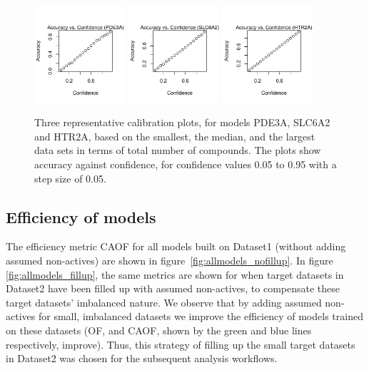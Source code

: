 \documentclass[utf8]{frontiersSCNS} %
\newcommand{\inlinetodo}[1]{{\color{magenta}\oldtodo[inline]{\color{white}\textsf{#1}}}}
\begin{document}
\begin{figure}[h!]
\includegraphics[width=0.3\textwidth]{figures/calibration_plots/pde3a_calib.pdf}
\includegraphics[width=0.3\textwidth]{figures/calibration_plots/slc6a2_calib.pdf}
\includegraphics[width=0.3\textwidth]{figures/calibration_plots/htr2a_calib.pdf}
    \caption{Three representative calibration plots, for models PDE3A, SLC6A2
    and HTR2A, based on the smallest, the median, and the largest data sets in
    terms of total number of compounds. The plots show accuracy against
    confidence, for confidence values 0.05 to 0.95 with a step size of 0.05.}
    \label{fig:calibration_plots}
\end{figure}


\subsection{Efficiency of models}
The efficiency metric CAOF for all models built on Dataset1 (without
adding assumed non-actives) are shown in figure~\ref{fig:allmodels_nofillup}.
In figure \ref{fig:allmodels_fillup}, the same metrics are shown for when target
datasets in Dataset2 have been filled up with assumed non-actives, to compensate
these target datasets' imbalanced nature.
We observe that by adding assumed non-actives for small, imbalanced datasets we
improve the efficiency of models trained on these datasets (OF, and CAOF, shown
by the green and blue lines respectively, improve). Thus, this strategy of
filling up the small target datasets in Dataset2 was chosen for the subsequent
analysis workflows.
\end{document}
